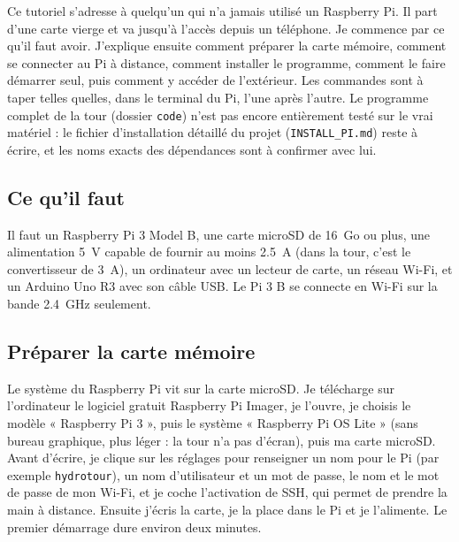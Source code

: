 \clearpage
{}

Ce tutoriel s'adresse à quelqu'un qui n'a jamais utilisé un Raspberry Pi. Il part d'une carte vierge et va jusqu'à l'accès depuis un téléphone. Je commence par ce qu'il faut avoir. J'explique ensuite comment préparer la carte mémoire, comment se connecter au Pi à distance, comment installer le programme, comment le faire démarrer seul, puis comment y accéder de l'extérieur. Les commandes sont à taper telles quelles, dans le terminal du Pi, l'une après l'autre. Le programme complet de la tour (dossier \texttt{code}) n'est pas encore entièrement testé sur le vrai matériel : le fichier d'installation détaillé du projet (\texttt{INSTALL\_PI.md}) reste à écrire, et les noms exacts des dépendances sont à confirmer avec lui.

\subsection{Ce qu'il faut}

Il faut un Raspberry Pi 3 Model B, une carte microSD de \qty{16}{Go} ou plus, une alimentation \qty{5}{V} capable de fournir au moins \qty{2,5}{A} (dans la tour, c'est le convertisseur de \qty{3}{A}), un ordinateur avec un lecteur de carte, un réseau Wi-Fi, et un Arduino Uno R3 avec son câble USB. Le Pi 3 B se connecte en Wi-Fi sur la bande \qty{2,4}{GHz} seulement.

\subsection{Préparer la carte mémoire}

Le système du Raspberry Pi vit sur la carte microSD. Je télécharge sur l'ordinateur le logiciel gratuit Raspberry Pi Imager, je l'ouvre, je choisis le modèle « Raspberry Pi 3 », puis le système « Raspberry Pi OS Lite » (sans bureau graphique, plus léger : la tour n'a pas d'écran), puis ma carte microSD. Avant d'écrire, je clique sur les réglages pour renseigner un nom pour le Pi (par exemple \texttt{hydrotour}), un nom d'utilisateur et un mot de passe, le nom et le mot de passe de mon Wi-Fi, et je coche l'activation de SSH, qui permet de prendre la main à distance. Ensuite j'écris la carte, je la place dans le Pi et je l'alimente. Le premier démarrage dure environ deux minutes.

